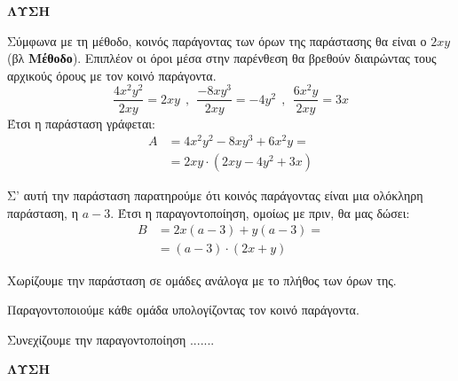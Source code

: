 \textbf{ΛΥΣΗ}
\begin{rlist}
\item Σύμφωνα με τη μέθοδο, κοινός παράγοντας των όρων της παράστασης θα είναι ο $ 2xy $ (βλ \textbf{Μέθοδο}). Επιπλέον οι όροι μέσα στην παρένθεση θα βρεθούν διαιρώντας τους αρχικούς όρους με τον κοινό παράγοντα.
\[ \frac{4x^2y^2}{2xy}=2xy\ \ ,\ \ \frac{-8xy^3}{2xy}=-4y^2\ \ ,\ \ \frac{6x^2y}{2xy}=3x \]
Έτσι η παράσταση γράφεται:
\begin{align*}
A&=4x^2y^2-8xy^3+6x^2y=\\
&=2xy\cdot\left(2xy-4y^2+3x \right) 
\end{align*}
\item Σ' αυτή την παράσταση παρατηρούμε ότι κοινός παράγοντας είναι μια ολόκληρη παράσταση, η $ a-3 $. Έτσι η παραγοντοποίηση, ομοίως με πριν, θα μας δώσει:
\begin{align*}
B&=2x(a-3)+y(a-3)=\\
&=(a-3)\cdot(2x+y)
\end{align*}
\end{rlist}
\begin{Methodos}[Ομαδοποίηση]{7cm}
\begin{bhma}
\item Χωρίζουμε την παράσταση σε ομάδες ανάλογα με το πλήθος των όρων της.
\item Παραγοντοποιούμε κάθε ομάδα υπολογίζοντας τον κοινό παράγοντα.
\item Συνεχίζουμε την παραγοντοποίηση .......
\end{bhma}
\end{Methodos}
\textbf{ΛΥΣΗ}
